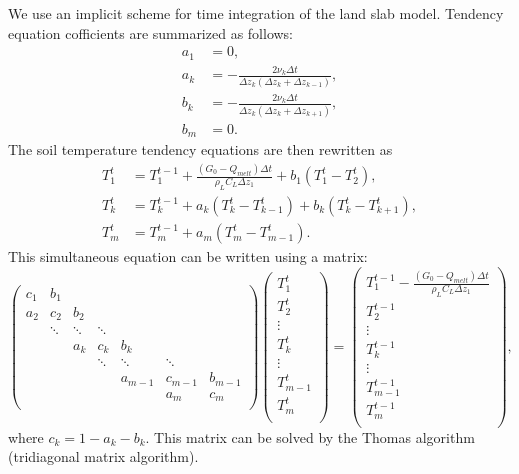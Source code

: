 We use an implicit scheme for time integration of the land slab model.
Tendency equation cofficients are summarized as follows:
\begin{align}
  a_{1} &= 0, \\
  a_{k} &= - \frac{2\nu_{k}\Delta t}{\Delta z_{k}(\Delta z_{k}+\Delta z_{k-1})}, \\
  b_{k} &= - \frac{2\nu_{k}\Delta t}{\Delta z_{k}(\Delta z_{k}+\Delta z_{k+1})}, \\
  b_{m} &= 0.
\end{align}
The soil temperature tendency equations are then rewritten as
\begin{align}
  T_{1}^{t} &= T_{1}^{t-1} + \frac{(G_{0} - Q_{melt})\Delta t}{\rho_{L}C_{L}\Delta z_{1}} + b_{1} (T_{1}^{t}-T_{2}^{t}), \\
  T_{k}^{t} &= T_{k}^{t-1} + a_{k} (T_{k}^{t}-T_{k-1}^{t}) + b_{k} (T_{k}^{t}-T_{k+1}^{t}), \\
  T_{m}^{t} &= T_{m}^{t-1} + a_{m} (T_{m}^{t}-T_{m-1}^{t}).
\end{align}
This simultaneous equation can be written using a matrix:
\begin{equation}
\begin{pmatrix}
  c_{1}  & b_{1}  &        &        &         &         &         \\
  a_{2}  & c_{2}  & b_{2}  &        &         &         &         \\
         & \ddots & \ddots & \ddots &         &         &         \\
         &        & a_{k}  & c_{k}  & b_{k}   &         &         \\
         &        &        & \ddots & \ddots  & \ddots  &         \\
         &        &        &        & a_{m-1} & c_{m-1} & b_{m-1} \\
         &        &        &        &         & a_{m}   & c_{m}   \\
\end{pmatrix}
\begin{pmatrix}
  T_{1}^{t}   \\
  T_{2}^{t}   \\
  \vdots      \\
  T_{k}^{t}   \\
  \vdots      \\
  T_{m-1}^{t} \\
  T_{m}^{t}   \\
\end{pmatrix}
=
\begin{pmatrix}
  T_{1}^{t-1} - \frac{(G_{0} - Q_{melt})\Delta t}{\rho_{L}C_{L}\Delta z_{1}} \\
  T_{2}^{t-1}   \\
  \vdots        \\
  T_{k}^{t-1}   \\
  \vdots        \\
  T_{m-1}^{t-1} \\
  T_{m}^{t-1}   \\
\end{pmatrix}
,
\end{equation}
where $c_{k} = 1 - a_{k} - b_{k}$.
This matrix can be solved by the Thomas algorithm (tridiagonal matrix algorithm).

